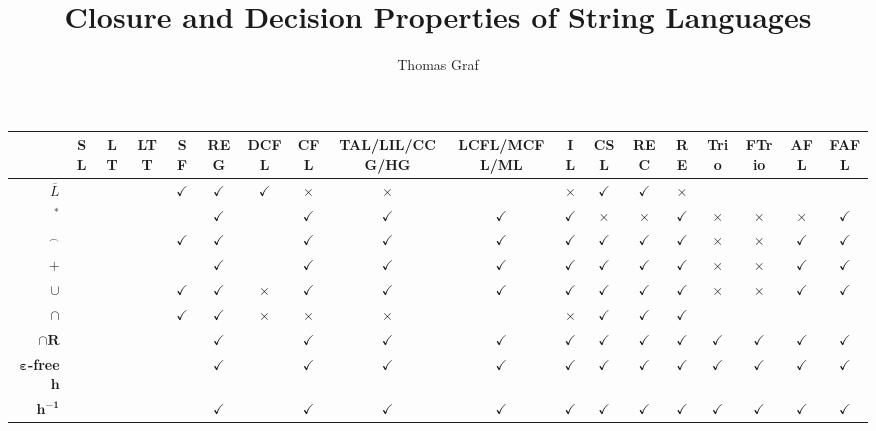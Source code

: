 \documentclass[letterpaper,10pt,oneside,landscape]{article}
\title{Closure and Decision Properties of String Languages}
\author{Thomas Graf}
\begin{document}
\pagestyle{empty}
\begin{table}[tbph]
\begin{center}
\begin{tabular}{rcccc|ccccccccc|cccc}
        & SL & LT & LTT & SF & REG & DCFL & CFL & TAL/LIL/CCG/HG & LCFL/MCFL/ML & IL & CSL & REC & RE & Trio & FTrio & AFL & FAFL\\\hline
        $\overline{L}$ & & & & $\checkmark$ & $\checkmark$ & $\checkmark$ & $\times$ & $\times$ & & $\times$ & $\checkmark$ & $\checkmark$ & $\times$\\
        $^*$ & & & & & $\checkmark$ & & $\checkmark$ & $\checkmark$ & $\checkmark$ & $\checkmark$ & $\times$ & $\times$ & $\checkmark$ & $\times$ & $\times$ & $\times$ & $\checkmark$\\
        $\mathbf{^\smallfrown}$ & & & & $\checkmark$ & $\checkmark$ & & $\checkmark$ & $\checkmark$ & $\checkmark$ & $\checkmark$ & $\checkmark$ & $\checkmark$ & $\checkmark$ & $\times$ & $\times$ & $\checkmark$ & $\checkmark$\\
        $\mathbf{+}$ & & & & & $\checkmark$ & & $\checkmark$ & $\checkmark$ & $\checkmark$ & $\checkmark$ & $\checkmark$ & $\checkmark$ & $\checkmark$ & $\times$ & $\times$ & $\checkmark$ & $\checkmark$\\
        $\mathbf{\cup}$ & & & & $\checkmark$ & $\checkmark$ & $\times$ & $\checkmark$ & $\checkmark$ & $\checkmark$ & $\checkmark$ & $\checkmark$ & $\checkmark$ & $\checkmark$ & $\times$ & $\times$ & $\checkmark$ & $\checkmark$\\
        $\cap$ & & & & $\checkmark$ & $\checkmark$ & $\times$ & $\times$ & $\times$ & & $\times$ & $\checkmark$ & $\checkmark$ & $\checkmark$\\
        $\mathbf{\cap R}$ & & & & & $\checkmark$ & & $\checkmark$ & $\checkmark$ & $\checkmark$ & $\checkmark$ & $\checkmark$ & $\checkmark$ & $\checkmark$ & $\checkmark$ & $\checkmark$ & $\checkmark$ & $\checkmark$\\
        $\mathbf{\varepsilon}$\textbf{-free} $\mathbf{h}$ & & & & & $\checkmark$ & & $\checkmark$ & $\checkmark$ & $\checkmark$ & $\checkmark$ & $\checkmark$ & $\checkmark$ & $\checkmark$ & $\checkmark$ & $\checkmark$ & $\checkmark$ & $\checkmark$\\
        $\mathbf{h^{-1}}$ & & & & & $\checkmark$ & & $\checkmark$ & $\checkmark$ & $\checkmark$ & $\checkmark$ & $\checkmark$ & $\checkmark$ & $\checkmark$ & $\checkmark$ & $\checkmark$ & $\checkmark$ & $\checkmark$\\

\end{tabular}
\end{center}
\end{table}
\end{document}
